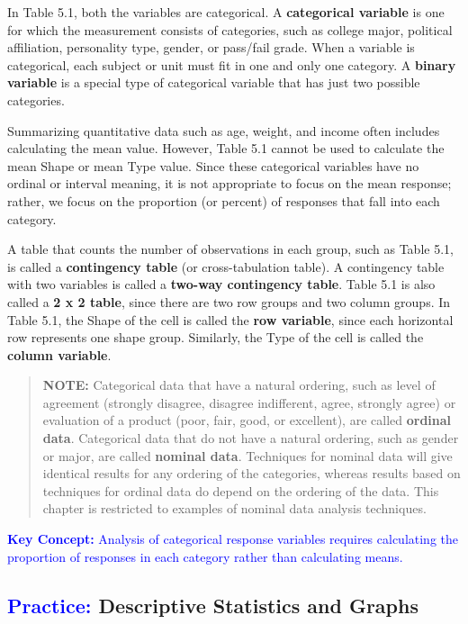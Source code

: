 \documentclass[
]{report}
\begin{document}
In Table 5.1, both the variables are categorical. A \textbf{categorical variable} is one for which the measurement consists of categories, such as college major, political affiliation, personality type, gender, or pass/fail grade. When a variable is categorical, each subject or unit must fit in one and only one category. A \textbf{binary variable} is a special type of categorical variable that has just two possible categories.

Summarizing quantitative data such as age, weight, and income often includes calculating the mean value. However, Table 5.1 cannot be used to calculate the mean Shape or mean Type value. Since these categorical variables have no ordinal or interval meaning, it is not appropriate to focus on the mean response; rather, we focus on the proportion (or percent) of responses that fall into each category.

A table that counts the number of observations in each group, such as Table 5.1, is called a \textbf{contingency table} (or cross-tabulation table). A contingency table with two variables is called a \textbf{two-way contingency table}. Table 5.1 is also called a \textbf{2 x 2 table}, since there are two row groups and two column groups. In Table 5.1, the Shape of the cell is called the \textbf{row variable}, since each horizontal row represents one shape group.
Similarly, the Type of the cell is called the \textbf{column variable}.

\begin{quote}
\textbf{NOTE:} Categorical data that have a natural ordering, such as level of agreement (strongly disagree, disagree indifferent, agree, strongly agree) or evaluation of a product (poor, fair, good, or excellent), are called \textbf{ordinal data}. Categorical data that do not have a natural ordering, such as gender or major, are called \textbf{nominal data}. Techniques for nominal data will give identical results for any ordering of the categories, whereas results based on techniques for ordinal data do depend on the ordering of the data. This chapter is restricted to examples of nominal data analysis techniques.
\end{quote}

\textbf{\textcolor{blue}{Key Concept:}}
\textcolor{blue}{Analysis of categorical response variables requires calculating the proportion of responses in each category rather than calculating means.}

\hypertarget{descriptive-statistics-and-graphs}{%
\subsection*{\texorpdfstring{\textcolor{blue}{Practice:} Descriptive Statistics and Graphs}{ Descriptive Statistics and Graphs}}\label{descriptive-statistics-and-graphs}}
\end{document}
